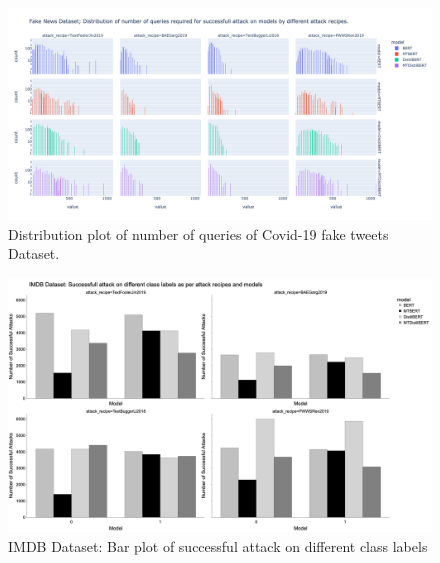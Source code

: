 \documentclass[%
	BCOR=8mm, %
	DIV=12,
	toc=bibliography, %
	toc=listof, %
	oneside, %
	egregdoesnotlikesansseriftitles, %
	]{scrbook}
\begin{document}
\begin{figure}[H]
    \centering
    \includegraphics[width=1.1\linewidth]{img/NumQueriesDist_fknews.png}
    \caption[Distribution plot of number of queries of Covid-19 fake tweets Dataset]{Distribution plot of number of queries of Covid-19 fake tweets Dataset.}
    \label{fig:Queries_distribution_fk}
\end{figure}
\begin{figure}[H]
    \centering
    \includegraphics[width=1.0\linewidth]{img/IMDB_class_attack_1.png}
    \caption[Bar plot of successful attack on different class labels for IMDB dataset]{IMDB Dataset: Bar plot of successful attack on different class labels}
    \label{fig:classattack_imdb}
\end{figure}
\end{document}
